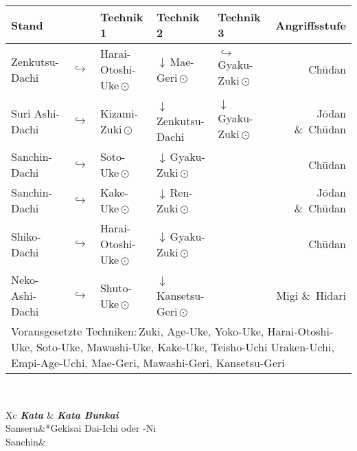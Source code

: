 \begin{tcolorbox}[colframe=BRBELT,colback=white,coltitle=white,title=1. Kyu:\indent Kihon-Ido Kata - Partnerformen - Erwartungshorizont]	
\null\vfill\null
{}
	\begin{tabularx}{\textwidth}{llllXr}
		\textbf{Stand} 	&  	& \textbf{Technik 1} & \textbf{Technik 2} 				& \textbf{Technik 3}& \textbf{Angriffsstufe}\\
		\midrule
		Zenkutsu-Dachi 	& \(\hookrightarrow\)	& Harai-Otoshi-Uke\,\(\odot\) 	& \(\downarrow\)\,Mae-Geri\,\(\odot\)	& \(\hookrightarrow\) 	 Gyaku-Zuki\,\(\odot\)	& Ch\={u}dan \\
		Suri Ashi-Dachi	& \(\hookrightarrow\)	& Kizami-Zuki\,\(\odot\)		& \(\downarrow\)\,Zenkutsu-Dachi & \(\downarrow\)	 Gyaku-Zuki\,\(\odot\)	& J\={o}dan \&~Ch\={u}dan \\
		Sanchin-Dachi 	& \(\hookrightarrow\)	& Soto-Uke\,\(\odot\) 			& \(\downarrow\)\,Gyaku-Zuki\,\(\odot\) 				&						&	 					 Ch\={u}dan \\
		Sanchin-Dachi 	& \(\hookrightarrow\)	& Kake-Uke\,\(\odot\) 			& \(\downarrow\)\,Ren-Zuki\,\(\odot\) 					&						& 						 J\={o}dan \&~Ch\={u}dan \\
		Shiko-Dachi 	& \(\hookrightarrow\)	& Harai-Otoshi-Uke\,\(\odot\) 	& \(\downarrow\)\,Gyaku-Zuki\,\(\odot\) 				&						& 						 Ch\={u}dan \\
		Neko-Ashi-Dachi	& \(\hookrightarrow\)	& Shuto-Uke\,\(\odot\) 			& \(\downarrow\)\,Kansetsu-Geri\,\(\odot\) 					&						& 						 Migi \&~Hidari  \\
		\midrule
		\multicolumn{6}{p{\linewidth-2\tabcolsep}}{{\footnotesize Vorausgesetzte Techniken:\,Zuki, Age-Uke, Yoko-Uke, Harai-Otoshi-Uke, Soto-Uke, Mawashi-Uke, Kake-Uke, Teisho-Uchi Uraken-Uchi, Empi-Age-Uchi, Mae-Geri, Mawashi-Geri, Kansetsu-Geri}}\\
		\midrule
	\end{tabularx}\\
	\null\vfill\null
	\begin{minipage}[t]{0.45\textwidth}
			\begin{tabularx}{\textwidth}{Xc}
				\midrule
				\textbf{\textit{Kata}} & \textbf{\textit{Kata Bunkai}} \\
				Sanseru&*{Gekisai Dai-Ichi oder -Ni}\\
				Sanchin& \\
				\midrule
			\end{tabularx}
		\end{minipage}

\end{tcolorbox}
